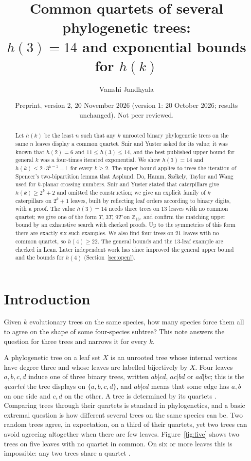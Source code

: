 \documentclass[11pt]{amsart}
\title[Common quartets of several phylogenetic trees]{Common quartets of several phylogenetic trees:\\
$h(3)=14$ and exponential bounds for $h(k)$}
\author{Vamshi Jandhyala}
\date{Preprint, version 2, 20 November 2026 (version 1: 20 October 2026; results unchanged). Not peer reviewed.}
\theoremstyle{definition}
\begin{document}
\begin{abstract}
Let $h(k)$ be the least $n$ such that any $k$ unrooted binary phylogenetic trees on the same $n$ leaves display a
common quartet. Snir and Yuster asked for its value; it was known that $h(2)=6$ and $11\le h(3)\le 14$, and the
best published upper bound for general $k$ was a four-times iterated exponential. We show $h(3)=14$ and
$h(k)\le 2\cdot 3^{k-1}+1$ for every $k\ge 2$. The upper bound applies to trees the iteration of Spencer's
two-bipartition lemma that Asplund, Do, Hamm, Sz\'ekely, Taylor and Wang used for $k$-planar crossing numbers. Snir
and Yuster stated that caterpillars give $h(k)\ge 2^k+2$ and omitted the construction; we give an explicit family of
$k$ caterpillars on $2^k+1$ leaves, built by reflecting leaf orders according to binary digits, with a proof. The
value $h(3)=14$ needs three trees on $13$ leaves with no common quartet; we give one of the form $T$, $3T$, $9T$ on
$\mathbb{Z}_{13}$, and confirm the matching upper bound by an exhaustive search with checked proofs. Up to the
symmetries of this form there are exactly six such examples. We also find
four trees on $21$ leaves with no common quartet, so $h(4)\ge 22$. The general bounds and the $13$-leaf example are
checked in Lean. Later independent work has since improved the general upper bound and the bounds for $h(4)$
(Section~\ref{sec:open}).
\end{abstract}

\maketitle

\section{Introduction}

Given $k$ evolutionary trees on the same species, how many species force them all to agree on the shape of some
four-species subtree? This note answers the question for three trees and narrows it for every $k$.

A phylogenetic tree on a leaf set $X$ is an unrooted tree whose internal vertices have degree three and whose leaves
are labelled bijectively by $X$. Four leaves $a,b,c,d$ induce one of three binary trees, written $ab|cd$, $ac|bd$ or
$ad|bc$; this is the \emph{quartet} the tree displays on $\{a,b,c,d\}$, and $ab|cd$ means that some edge has $a,b$
on one side and $c,d$ on the other. A tree is determined by its quartets \cite{CS,BD}. Comparing trees through
their quartets is standard in phylogenetics, and a basic extremal question is how different several trees on the
same species can be. Two random trees agree, in expectation, on a third of their quartets, yet two trees can avoid
agreeing altogether when there are few leaves. Figure~\ref{fig:five} shows two trees on five leaves with no quartet
in common. On six or more leaves this is impossible: any two trees share a quartet \cite{BD}.
\end{document}
